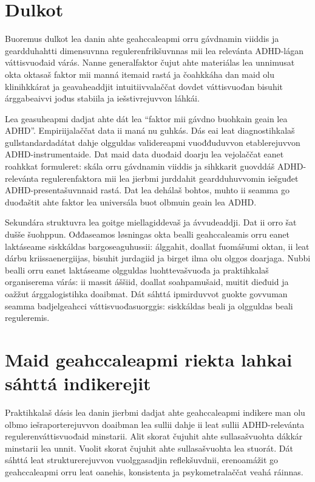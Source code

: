 \documentclass[11pt,a4paper]{article}
\begin{document}
\section{Dulkot}
Buoremus dulkot lea danin ahte geahccaleapmi orru gávdnamin viiddis ja geardduhahtti dimensuvnna regulerenfrikšuvnnas mii lea relevánta ADHD-lágan váttisvuođaid várás. Nanne generalfaktor čujut ahte materiálas lea unnimusat okta oktasaš faktor mii manná itemaid rastá ja čoahkkáha dan maid olu klinihkkárat ja geavaheaddjit intuitiivvalaččat dovdet váttisvuođan bisuhit árggabeaivvi jođus stabiila ja iešstivrejuvvon láhkái.

Lea geasuheapmi dadjat ahte dát lea ``faktor mii gávdno buohkain geain lea ADHD''. Empiriijalaččat data ii maná nu guhkás. Dás eai leat diagnostihkalaš gullstandardadátat dahje olgguldas validereapmi vuođđuduvvon etablerejuvvon ADHD-instrumentaide. Dat maid data duođaid doarju lea vejolaččat eanet roahkkat formuleret: skála orru gávdnamin viiddis ja sihkkarit guovddáš ADHD-relevánta regulerenfaktora mii lea jierbmi jurddahit geardduhuvvomin iešguđet ADHD-presentašuvnnaid rastá. Dat lea dehálaš bohtos, muhto ii seamma go duođaštit ahte faktor lea universála buot olbmuin geain lea ADHD.

Sekundára struktuvra lea goitge miellagiddevaš ja ávvudeaddji. Dat ii orro šat dušše šuohppun. Ođđaseamos løsningas okta bealli geahccaleamis orru eanet laktáseame siskkáldas bargoseaguhussii: álggahit, doallat fuomášumi oktan, ii leat dárbu kriissaenergiijas, bisuhit jurdagiid ja birget ilma olu olggos doarjaga. Nubbi bealli orru eanet laktáseame olgguldas luohttevašvuođa ja praktihkalaš organiserema várás: ii massit áššiid, doallat soahpamušaid, muitit dieđuid ja oažžut árggalogistihka doaibmat. Dát sáhttá ipmirduvvot guokte govvuman seamma badjelgeahcci váttisvuođasuorggis: siskkáldas beali ja olgguldas beali reguleremis.

\section{Maid geahccaleapmi riekta lahkai sáhttá indikerejit}
Praktihkalaš dásis lea danin jierbmi dadjat ahte geahccaleapmi indikere man olu olbmo iešraporterejuvvon doaibman lea sullii dahje ii leat sullii ADHD-relevánta regulerenváttisvuođaid minstarii. Alit skorat čujuhit ahte sullasašvuohta dákkár minstarii lea unnit. Vuolit skorat čujuhit ahte sullasašvuohta lea stuorát. Dát sáhttá leat strukturerejuvvon vuolggasadjin reflekšuvdnii, erenoamážit go geahccaleapmi orru leat oanehis, konsistenta ja psykometralaččat veahá ráinnas.
\end{document}
